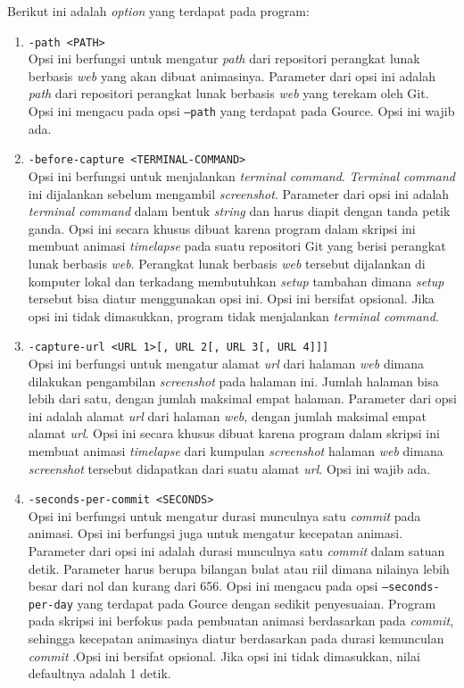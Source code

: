 Berikut ini adalah \textit{option} yang terdapat pada program:
\begin{enumerate}
\item \texttt{-path <PATH>}\\
Opsi ini berfungsi untuk mengatur \textit{path} dari repositori perangkat lunak berbasis \textit{web} yang akan dibuat animasinya. Parameter dari opsi ini adalah \textit{path} dari repositori perangkat lunak berbasis \textit{web} yang terekam oleh Git. Opsi ini mengacu pada opsi \texttt{--path} yang terdapat pada Gource. Opsi ini wajib ada. 

\item \texttt{-before-capture <TERMINAL-COMMAND>}\\
Opsi ini berfungsi untuk menjalankan \textit{terminal command}. \textit{Terminal command} ini dijalankan sebelum mengambil \textit{screenshot}. Parameter dari opsi ini adalah \textit{terminal command} dalam bentuk \textit{string} dan harus diapit dengan tanda petik ganda. Opsi ini secara khusus dibuat karena program dalam skripsi ini membuat animasi \textit{timelapse} pada suatu repositori Git yang berisi perangkat lunak berbasis \textit{web}. Perangkat lunak berbasis \textit{web} tersebut dijalankan di komputer lokal dan terkadang membutuhkan \textit{setup} tambahan dimana \textit{setup} tersebut bisa diatur menggunakan opsi ini. Opsi ini bersifat opsional. Jika opsi ini tidak dimasukkan, program tidak menjalankan \textit{terminal command}.

\item \texttt{-capture-url <URL 1>[, URL 2[, URL 3[, URL 4]]]}\\
Opsi ini berfungsi untuk mengatur alamat \textit{url} dari halaman \textit{web} dimana dilakukan pengambilan \textit{screenshot} pada halaman ini. Jumlah halaman bisa lebih dari satu, dengan jumlah maksimal empat halaman. Parameter dari opsi ini adalah alamat \textit{url} dari halaman \textit{web}, dengan jumlah maksimal empat alamat \textit{url}. Opsi ini secara khusus dibuat karena program dalam skripsi ini membuat animasi \textit{timelapse} dari kumpulan \textit{screenshot} halaman \textit{web} dimana \textit{screenshot} tersebut didapatkan dari suatu alamat \textit{url}. Opsi ini wajib ada.

\item \texttt{-seconds-per-commit <SECONDS>}\\
Opsi ini berfungsi untuk mengatur durasi munculnya satu \textit{commit} pada animasi. Opsi ini berfungsi juga untuk mengatur kecepatan animasi. Parameter dari opsi ini adalah durasi munculnya satu \textit{commit} dalam satuan detik. Parameter harus berupa bilangan bulat atau riil dimana nilainya lebih besar dari nol dan kurang dari 656. Opsi ini mengacu pada opsi \texttt{--seconds-per-day} yang terdapat pada Gource dengan sedikit penyesuaian. Program pada skripsi ini berfokus pada pembuatan animasi berdasarkan pada \textit{commit}, sehingga kecepatan animasinya diatur berdasarkan pada durasi kemunculan \textit{commit} .Opsi ini bersifat opsional. Jika opsi ini tidak dimasukkan, nilai defaultnya adalah 1 detik.


\end{enumerate}

